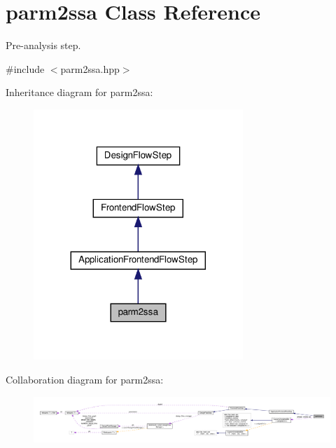 \hypertarget{classparm2ssa}{}\section{parm2ssa Class Reference}
\label{classparm2ssa}


Pre-\/analysis step.  




{\ttfamily \#include $<$parm2ssa.\+hpp$>$}



Inheritance diagram for parm2ssa\+:
\nopagebreak
\begin{figure}[H]
\begin{center}
\leavevmode
\includegraphics[width=224pt]{da/dcc/classparm2ssa__inherit__graph}
\end{center}
\end{figure}


Collaboration diagram for parm2ssa\+:
\nopagebreak
\begin{figure}[H]
\begin{center}
\leavevmode
\includegraphics[width=350pt]{d9/d3f/classparm2ssa__coll__graph}
\end{center}
\end{figure}
